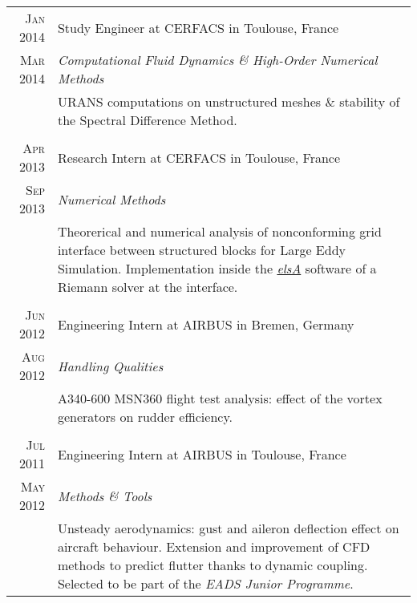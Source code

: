 \documentclass[a4paper,10pt]{article}
\begin{document}
\begin{tabular}{r|p{15cm}}
\textsc{Jan 2014}   & Study Engineer at \textsc{CERFACS} in Toulouse, France \\  
\textsc{Mar 2014}   & \emph{Computational Fluid Dynamics \& High-Order Numerical Methods} \\
                    & \footnotesize{URANS computations on unstructured meshes \& stability of the Spectral Difference Method.} \\
                    \multicolumn{2}{c}{} \\

\textsc{Apr 2013}   & Research Intern at \textsc{CERFACS} in Toulouse, France \\ 
\textsc{Sep 2013}   & \emph{Numerical Methods} \\
                    & \footnotesize{Theorerical and numerical analysis of nonconforming grid interface between structured blocks
                    for Large Eddy Simulation. Implementation inside the \href{http://elsa.onera.fr}{\emph{elsA}}
                    software of a Riemann solver at the interface.} \\
                    \multicolumn{2}{c}{} \\

\textsc{Jun 2012}   & Engineering Intern at \textsc{AIRBUS} in Bremen, Germany \\
\textsc{Aug 2012}   & \emph{Handling Qualities} \\
                    & \footnotesize{A340-600 MSN360 flight test analysis: effect of the vortex generators on rudder efficiency.} \\
                    \multicolumn{2}{c}{} \\

\textsc{Jul 2011}   & Engineering Intern at \textsc{AIRBUS} in Toulouse, France \\
\textsc{May 2012}   & \emph{Methods \& Tools} \\
                    & \footnotesize{Unsteady aerodynamics: gust and aileron deflection effect on aircraft behaviour. 
                    Extension and improvement of CFD methods to predict flutter thanks to dynamic coupling. 
                    Selected to be part of the \emph{EADS Junior Programme}.}
\end{tabular}
\end{document}

